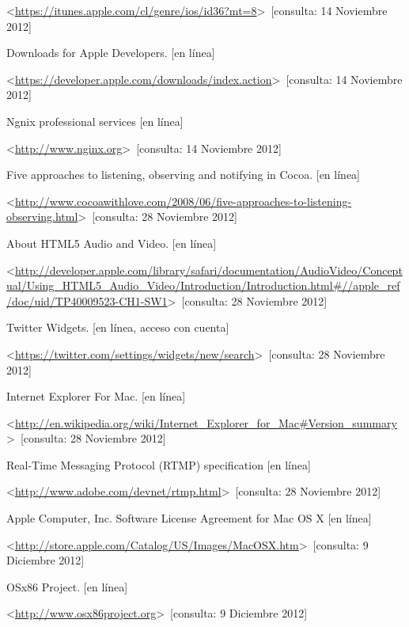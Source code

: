 \begin{thebibliography}{99}
\begin{sloppypar}
\textless \url{https://itunes.apple.com/cl/genre/ios/id36?mt=8}\textgreater \ [consulta: 14 Noviembre 2012] 

%
Downloads for Apple Developers. [en línea]\

\textless \url{https://developer.apple.com/downloads/index.action}\textgreater \ [consulta: 14 Noviembre 2012]

%
Ngnix professional services [en línea]\

\textless \url{http://www.nginx.org}\textgreater \ [consulta: 14 Noviembre 2012]

%
Five approaches to listening, observing and notifying in Cocoa. [en línea]\

\textless \url{http://www.cocoawithlove.com/2008/06/five-approaches-to-listening-observing.html}\textgreater \ [consulta: 28 Noviembre 2012]

%
About HTML5 Audio and Video. [en línea]\

\textless \url{http://developer.apple.com/library/safari/documentation/AudioVideo/Conceptual/Using_HTML5_Audio_Video/Introduction/Introduction.html\#//apple_ref/doc/uid/TP40009523-CH1-SW1}\textgreater \ [consulta: 28 Noviembre 2012]

%
Twitter Widgets. [en línea, acceso con cuenta]\

\textless \url{https://twitter.com/settings/widgets/new/search}\textgreater \ [consulta: 28 Noviembre 2012]

%
Internet Explorer For Mac. [en línea]\

\textless \url{http://en.wikipedia.org/wiki/Internet_Explorer_for_Mac\#Version_summary}\textgreater \ [consulta: 28 Noviembre 2012]

%
Real-Time Messaging Protocol (RTMP) specification [en línea]\

\textless \url{http://www.adobe.com/devnet/rtmp.html}\textgreater \ [consulta: 28 Noviembre 2012]

%
Apple Computer, Inc. Software License Agreement for Mac OS X [en línea]\

\textless \url{http://store.apple.com/Catalog/US/Images/MacOSX.htm}\textgreater \ [consulta: 9 Diciembre 2012]

%
OSx86 Project. [en línea]\

\textless \url{http://www.osx86project.org}\textgreater \ [consulta: 9 Diciembre 2012]


\end{sloppypar}
\end{thebibliography}
